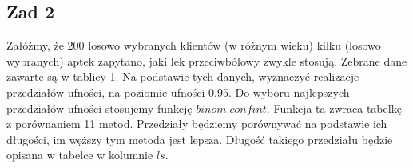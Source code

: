 \documentclass[12pt]{mwart}\usepackage[]{graphicx}\usepackage[]{color}
\begin{document}
\newpage
\subsection*{Zad 2}
Załóżmy, że 200 losowo wybranych klientów (w różnym wieku) kilku (losowo wybranych) aptek zapytano, jaki lek przeciwbólowy zwykle stosują. Zebrane dane zawarte są w tablicy 1. Na podstawie tych danych, wyznaczyć realizacje przedziałów ufności, na poziomie ufności 0.95. \newline
\newline
Do wyboru najlepszych przedziałów ufności stosujemy funkcję $binom.confint$. Funkcja ta zwraca tabelkę z porównaniem 11 metod. Przedziały będziemy porównywać na podstawie ich długości, im węższy tym metoda jest lepsza. Długość takiego przedziału będzie opisana w tabelce w kolumnie $ls$.\newline
\end{document}
